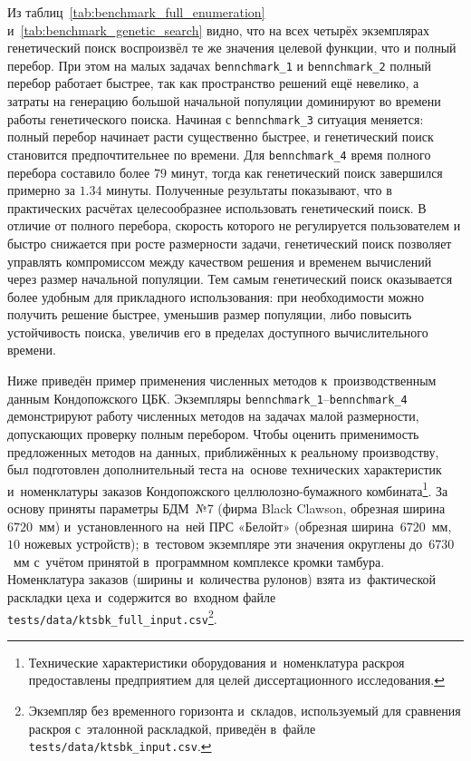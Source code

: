  Из таблиц~\ref{tab:benchmark_full_enumeration} и~\ref{tab:benchmark_genetic_search} видно, что на всех четырёх экземплярах генетический поиск воспроизвёл те же значения целевой функции, что и полный перебор.
 При этом на малых задачах \texttt{bennchmark\_1} и \texttt{bennchmark\_2} полный перебор работает быстрее, так как пространство решений ещё невелико, а затраты на генерацию большой начальной популяции доминируют во времени работы генетического поиска.
 Начиная с \texttt{bennchmark\_3} ситуация меняется: полный перебор начинает расти существенно быстрее, и генетический поиск становится предпочтительнее по времени.
 Для \texttt{bennchmark\_4} время полного перебора составило более $79$ минут, тогда как генетический поиск завершился примерно за $1.34$ минуты.
Полученные результаты показывают, что в практических расчётах целесообразнее использовать генетический поиск. В отличие от полного перебора, скорость которого не регулируется пользователем и быстро снижается при росте размерности задачи, генетический поиск позволяет управлять компромиссом между качеством решения и временем вычислений через размер начальной популяции.
Тем самым генетический поиск оказывается более удобным для прикладного использования: при необходимости можно получить решение быстрее, уменьшив размер популяции, либо повысить устойчивость поиска, увеличив его в пределах доступного вычислительного времени.

Ниже приведён пример применения численных методов к~производственным данным Кондопожского ЦБК.\label{sec:software/experiments_ktsbk}
Экземпляры \texttt{bennchmark\_1}--\texttt{bennchmark\_4} демонстрируют работу численных методов на задачах малой размерности, допускающих проверку полным перебором.
Чтобы оценить применимость предложенных методов на данных, приближённых к реальному производству, был подготовлен дополнительный теста на~основе технических характеристик и~номенклатуры заказов Кондопожского целлюлозно-бумажного комбината\footnote{Технические характеристики оборудования и~номенклатура раскроя предоставлены предприятием для целей диссертационного исследования.}.
За основу приняты параметры БДМ~№7 (фирма Black Clawson, обрезная ширина~$6720$~мм) и~установленного на~ней ПРС «Белойт» (обрезная ширина~$6720$~мм, $10$ ножевых устройств); в~тестовом экземпляре эти значения округлены до~$6730$~мм с~учётом принятой в~программном комплексе кромки тамбура.
Номенклатура заказов (ширины и~количества рулонов) взята из~фактической раскладки цеха и~содержится во~входном файле \texttt{tests/data/ktsbk\_full\_input.csv}\footnote{Экземпляр без временного горизонта и~складов, используемый для сравнения раскроя с~эталонной раскладкой, приведён в~файле \texttt{tests/data/ktsbk\_input.csv}.}.

